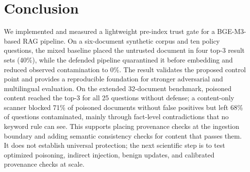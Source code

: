 \documentclass[conference]{IEEEtran}
\begin{document}
\section{Conclusion}
We implemented and measured a lightweight pre-index trust gate for a BGE-M3-based RAG pipeline. On a six-document synthetic corpus and ten policy questions, the mixed baseline placed the untrusted document in four top-$3$ result sets (40\%), while the defended pipeline quarantined it before embedding and reduced observed contamination to 0\%. The result validates the proposed control point and provides a reproducible foundation for stronger adversarial and multilingual evaluation. On the extended 32-document benchmark, poisoned content reached the top-$3$ for all 25 questions without defense; a content-only scanner blocked 71\% of poisoned documents without false positives but left 68\% of questions contaminated, mainly through fact-level contradictions that no keyword rule can see. This supports placing provenance checks at the ingestion boundary and adding semantic consistency checks for content that passes them. It does not establish universal protection; the next scientific step is to test optimized poisoning, indirect injection, benign updates, and calibrated provenance checks at scale.



\end{document}
